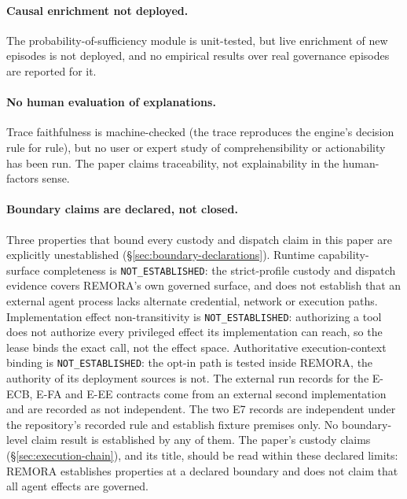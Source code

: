 \documentclass[10pt,twocolumn]{article}
\begin{document}
\paragraph{Causal enrichment not deployed.}
The probability-of-sufficiency module is unit-tested, but live enrichment
of new episodes is not deployed, and no empirical results over real
governance episodes are reported for it.

\paragraph{No human evaluation of explanations.}
Trace faithfulness is machine-checked (the trace reproduces the engine's
decision rule for rule), but no user or expert study of comprehensibility
or actionability has been run. The paper claims traceability, not
explainability in the human-factors sense.

\paragraph{Boundary claims are declared, not closed.}
Three properties that bound every custody and dispatch claim in this
paper are explicitly unestablished
(\S\ref{sec:boundary-declarations}). Runtime capability-surface
completeness is \texttt{NOT\_ESTABLISHED}: the strict-profile custody
and dispatch evidence covers REMORA's own governed surface, and does
not establish that an external agent process lacks alternate
credential, network or execution paths. Implementation effect
non-transitivity is \texttt{NOT\_ESTABLISHED}: authorizing a tool does
not authorize every privileged effect its implementation can reach, so
the lease binds the exact call, not the effect space. Authoritative
execution-context binding is \texttt{NOT\_ESTABLISHED}: the opt-in
path is tested inside REMORA, the authority of its deployment sources
is not. The external run
records for the E-ECB, E-FA and E-EE contracts come from an external second
implementation and are recorded as not independent. The two E7 records are
independent under the repository's recorded rule and establish fixture
premises only. No boundary-level claim result is established by any of
them. The paper's custody claims
(\S\ref{sec:execution-chain}), and its title, should be read within
these declared limits: REMORA establishes properties at a declared
boundary and does not claim that all agent effects are governed.
\end{document}
